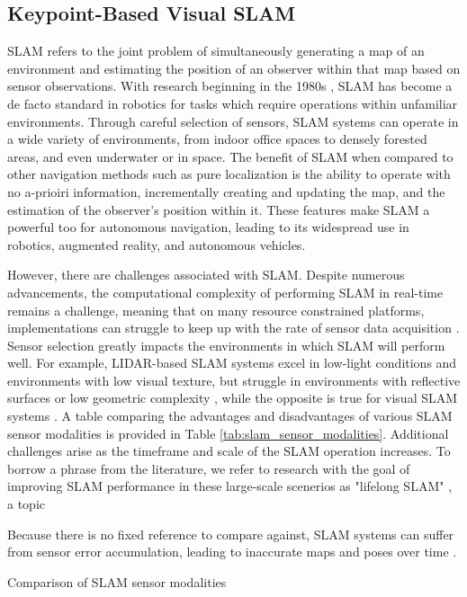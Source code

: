 \subsection{Keypoint-Based Visual SLAM}

SLAM refers to the joint problem of simultaneously generating a map of an environment and estimating the position of an observer within that map based on sensor observations. With research beginning in the 1980s \cite{smithEstimatingUncertainSpatial1988}, SLAM has become a de facto standard in robotics for tasks which require operations within unfamiliar environments. Through careful selection of sensors, SLAM systems can operate in a wide variety of environments, from indoor office spaces to densely forested areas, and even underwater or in space. The benefit of SLAM when compared to other navigation methods such as pure localization is the ability to operate with no a-prioiri information, incrementally creating and updating the map, and the estimation of the observer's position within it. These features make SLAM a powerful too for autonomous navigation, leading to its widespread use in robotics, augmented reality, and autonomous vehicles.

However, there are challenges associated with SLAM. Despite numerous advancements, the computational complexity of performing SLAM in real-time remains a challenge, meaning that on many resource constrained platforms, implementations can struggle to keep up with the rate of sensor data acquisition \cite{semenovaQuantitativeAnalysisSystem2022}. Sensor selection greatly impacts the environments in which SLAM will perform well. For example, LIDAR-based SLAM systems excel in low-light conditions and environments with low visual texture, but struggle in environments with reflective surfaces or low geometric complexity \cite{khanComparativeSurveyLiDARSLAM2021}, while the opposite is true for visual SLAM systems \cite{camposORBSLAM3AccurateOpenSource2021a}. A table comparing the advantages and disadvantages of various SLAM sensor modalities is provided in Table \ref{tab:slam_sensor_modalities}. Additional challenges arise as the timeframe and scale of the SLAM operation increases. To borrow a phrase from the literature, we refer to research with the goal of improving SLAM performance in these large-scale scenerios as "lifelong SLAM" \cite{shiAreWeReady2020}, a topic 

Because there is no fixed reference to compare against, SLAM systems can suffer from sensor error accumulation, leading to inaccurate maps and poses over time \cite{cadenaPresentFutureSimultaneous2016}.

\begin{table}[ht!]
    \centering
    \caption{Comparison of SLAM sensor modalities}
    \label{tab:slam_sensor_modalities}
\end{table}